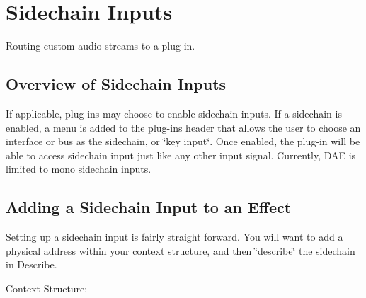 \hypertarget{a00808}{}\section{Sidechain Inputs}
\label{a00808}
Routing custom audio streams to a plug-\/in. 

\hypertarget{a00808_additionalFeatures_Sidechain_overview}{}\subsection{Overview of Sidechain Inputs}\label{a00808_additionalFeatures_Sidechain_overview}
If applicable, plug-\/ins may choose to enable sidechain inputs. If a sidechain is enabled, a menu is added to the plug-\/in\textquotesingle{}s header that allows the user to choose an interface or bus as the sidechain, or \char`\"{}key input\char`\"{}. Once enabled, the plug-\/in will be able to access sidechain input just like any other input signal. Currently, D\+AE is limited to mono sidechain inputs.\hypertarget{a00808_additionalFeatures_Sidechain_adding}{}\subsection{Adding a Sidechain Input to an Effect}\label{a00808_additionalFeatures_Sidechain_adding}
Setting up a sidechain input is fairly straight forward. You will want to add a physical address within your context structure, and then \char`\"{}describe\char`\"{} the sidechain in Describe.

Context Structure\+:


\begin{DoxyCode}{0}
\DoxyCodeLine{\textcolor{comment}{//=============================}}
\DoxyCodeLine{\textcolor{comment}{// Component context definitions}}
\DoxyCodeLine{\textcolor{comment}{//=============================}}
\DoxyCodeLine{}
\DoxyCodeLine{\textcolor{comment}{// Context structure}}
\DoxyCodeLine{\{}
\DoxyCodeLine{   [...]}
\DoxyCodeLine{   [...]}
\DoxyCodeLine{\};}
\DoxyCodeLine{}
\DoxyCodeLine{\textcolor{comment}{// Physical addresses within the context}}
\DoxyCodeLine{\{}
\DoxyCodeLine{    [...]}
\DoxyCodeLine{    [...]}
\DoxyCodeLine{\};}
\end{DoxyCode}


